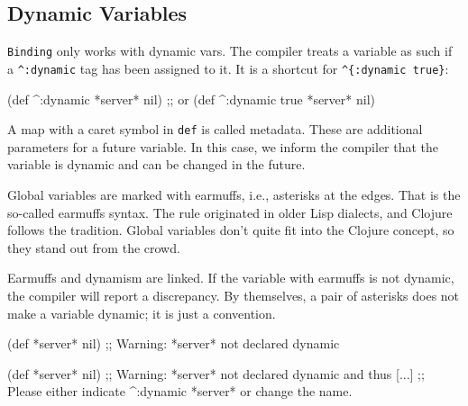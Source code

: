 \subsection{Dynamic Variables}

\label{dynamic-vars}


\verb|Binding| only works with dynamic vars.
The compiler treats a variable as such if a \verb|^:dynamic| tag has been assigned to it.
It is a shortcut for \verb|^{:dynamic true}|:

\begin{english}
  \begin{clojure}
(def ^:dynamic *server* nil)
;; or
(def ^{:dynamic true} *server* nil)
  \end{clojure}
\end{english}

A map with a caret symbol in \verb|def| is called metadata.
These are additional parameters for a future variable.
In this case, we inform the compiler that the variable is dynamic and can be changed in the future.

Global variables are marked with earmuffs, i.e., asterisks at the edges.
That is the so-called earmuffs syntax.
The rule originated in older Lisp dialects, and Clojure follows the tradition.
Global variables don't quite fit into the Clojure concept, so they stand out from the crowd.


Earmuffs and dynamism are linked.
If the variable with earmuffs is not dynamic, the compiler will report a discrepancy.
By themselves, a pair of asterisks does not make a variable dynamic; it is just a convention.

\ifx\DEVICETYPE\MOBILE

\begin{english}
  \begin{clojure}
(def *server* nil)
;; Warning: *server* not declared dynamic
  \end{clojure}
\end{english}

\else

\begin{english}
  \begin{clojure}
(def *server* nil)
;; Warning: *server* not declared dynamic and thus [...]
;; Please either indicate ^:dynamic *server* or change the name.
  \end{clojure}
\end{english}

